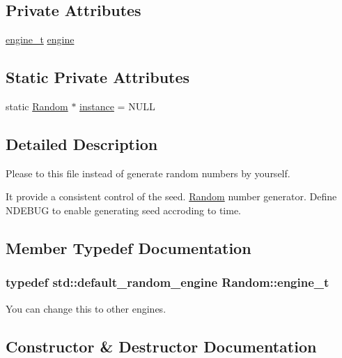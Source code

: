 \subsection*{Private Attributes}
\begin{DoxyCompactItemize}
\item 
\hyperlink{classRandom_ab1090b767f3e771eb8f846079869d1b4}{engine\+\_\+t} \hyperlink{classRandom_a273901a5b482668a1a0204b8691317e1}{engine}
\end{DoxyCompactItemize}
\subsection*{Static Private Attributes}
\begin{DoxyCompactItemize}
\item 
static \hyperlink{classRandom}{Random} $\ast$ \hyperlink{classRandom_a841a26400e4205f27cfb1ab4acaccb46}{instance} = N\+U\+L\+L
\end{DoxyCompactItemize}


\subsection{Detailed Description}
Please to this file instead of generate random numbers by yourself. 

It provide a consistent control of the seed. \hyperlink{classRandom}{Random} number generator. Define N\+D\+E\+B\+U\+G to enable generating seed accroding to time. 

\subsection{Member Typedef Documentation}
\hypertarget{classRandom_ab1090b767f3e771eb8f846079869d1b4}{}
\subsubsection[{engine\+\_\+t}]{\setlength{\rightskip}{0pt plus 5cm}typedef std\+::default\+\_\+random\+\_\+engine {\bf Random\+::engine\+\_\+t}}\label{classRandom_ab1090b767f3e771eb8f846079869d1b4}


You can change this to other engines. 



\subsection{Constructor \& Destructor Documentation}
\hypertarget{classRandom_a9bfadeaa4adc5ac44142d000b1c99441}{}
